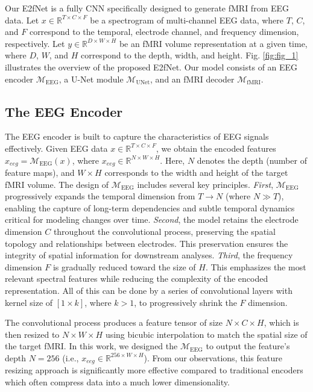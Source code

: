 Our E2fNet is a fully CNN specifically designed to generate fMRI from EEG data. Let $x \in \mathbb{R}^{T \times C \times F}$ be a spectrogram of multi-channel EEG data, where $T$, $C$, and $F$ correspond to the temporal, electrode channel, and frequency dimension, respectively. 
Let $y \in \mathbb{R}^{D \times W \times H}$ be an fMRI volume representation at a given time, where $D$, $W$, and $H$ correspond to the depth, width, and height. 
Fig. \ref{fig:fig_1} illustrates the overview of the proposed E2fNet. 
Our model consists of an EEG encoder $\mathcal{M}_{\mathrm{EEG}}$, a U-Net module $\mathcal{M}_{\mathrm{UNet}}$, and an fMRI decoder $\mathcal{M}_{\mathrm{fMRI}}$. 

\subsection{The EEG Encoder}
The EEG encoder is built to capture the characteristics of EEG signals effectively. 
Given EEG data \(x \in \mathbb{R}^{T \times C \times F}\), we obtain the encoded features 
\(x_{eeg} = \mathcal{M}_{\mathrm{EEG}}(x)\), where \(x_{eeg} \in \mathbb{R}^{N \times W \times H}\). 
Here, \(N\) denotes the depth (number of feature maps), and \(W \times H\) corresponds to the 
width and height of the target fMRI volume. The design of $\mathcal{M}_{\mathrm{EEG}}$ includes several key principles. 
\textit{First}, $\mathcal{M}_{\mathrm{EEG}}$ progressively expands the temporal dimension from $T \rightarrow N$ (where $N \gg T$), enabling the capture of long-term dependencies and subtle temporal dynamics critical for modeling changes over time. 
\textit{Second}, the model retains the electrode dimension $C$ throughout the convolutional process, preserving the spatial topology and relationships between electrodes. 
This preservation ensures the integrity of spatial information for downstream analyses. 
\textit{Third}, the frequency dimension $F$ is gradually reduced toward the size of $H$. 
This emphasizes the most relevant spectral features while reducing the complexity of the encoded representation. 
All of this can be done by a series of convolutional layers with kernel size of $[1 \times k]$, where $k > 1$, to progressively shrink the $F$ dimension. 

The convolutional process produces a feature tensor of size $N \times C \times H$, which is then resized to $N \times W \times H$ using bicubic interpolation to match the spatial size of the target fMRI. In this work, we designed the $\mathcal{M}_{\mathrm{EEG}}$ to output the feature's depth $N=256$ (i.e., $x_{eeg}\in \mathbb{R}^{256 \times W \times H}$). From our observations, this feature resizing approach is significantly more effective compared to traditional encoders which often compress data into a much lower dimensionality. 


